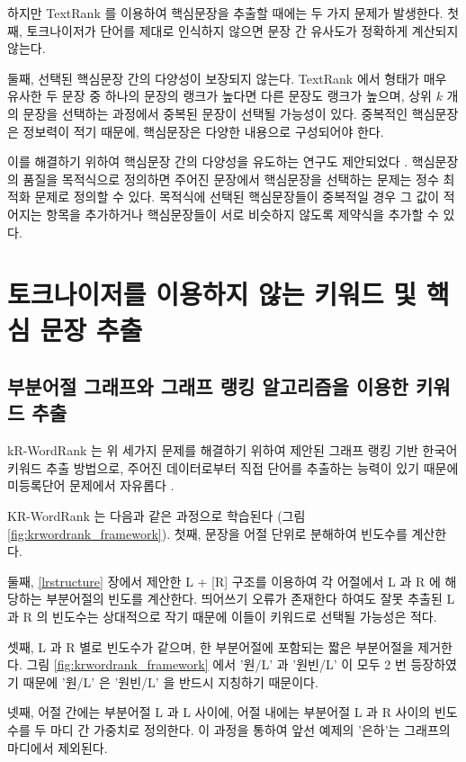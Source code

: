\documentclass[oneside, ko,phd]{snuthesis_utf8_kor}
\begin{document}
하지만 TextRank 를 이용하여 핵심문장을 추출할 때에는 두 가지 문제가 발생한다.
첫째, 토크나이저가 단어를 제대로 인식하지 않으면 문장 간 유사도가 정확하게 계산되지 않는다.

둘째, 선택된 핵심문장 간의 다양성이 보장되지 않는다.
TextRank 에서 형태가 매우 유사한 두 문장 중 하나의 문장의 랭크가 높다면 다른 문장도 랭크가 높으며, 상위 $k$ 개의 문장을 선택하는 과정에서 중복된 문장이 선택될 가능성이 있다.
중복적인 핵심문장은 정보력이 적기 때문에, 핵심문장은 다양한 내용으로 구성되어야 한다.

이를 해결하기 위하여 핵심문장 간의 다양성을 유도하는 연구도 제안되었다 \cite{mcdonald2007study, parveen2015topical}.
핵심문장의 품질을 목적식으로 정의하면 주어진 문장에서 핵심문장을 선택하는 문제는 정수 최적화 문제로 정의할 수 있다.
목적식에 선택된 핵심문장들이 중복적일 경우 그 값이 적어지는 항목을 추가하거나 핵심문장들이 서로 비슷하지 않도록 제약식을 추가할 수 있다.


\section{토크나이저를 이용하지 않는 키워드 및 핵심 문장 추출}

\subsection{부분어절 그래프와 그래프 랭킹 알고리즘을 이용한 키워드 추출}

kR-WordRank 는 위 세가지 문제를 해결하기 위하여 제안된 그래프 랭킹 기반 한국어 키워드 추출 방법으로, 주어진 데이터로부터 직접 단어를 추출하는 능력이 있기 때문에 미등록단어 문제에서 자유롭다 \cite{kim2014kr}.

KR-WordRank 는 다음과 같은 과정으로 학습된다 (그림 \ref{fig:krwordrank_framework}).
첫째, 문장을 어절 단위로 분해하여 빈도수를 계산한다.

둘째, \ref{lrstructure} 장에서 제안한 L + [R] 구조를 이용하여 각 어절에서 L 과 R 에 해당하는 부분어절의 빈도를 계산한다.
띄어쓰기 오류가 존재한다 하여도 잘못 추출된 L 과 R 의 빈도수는 상대적으로 작기 때문에 이들이 키워드로 선택될 가능성은 적다.

셋째, L 과 R 별로 빈도수가 같으며, 한 부분어절에 포함되는 짧은 부분어절을 제거한다.
그림 \ref{fig:krwordrank_framework} 에서 '원/L' 과 '원빈/L' 이 모두 2 번 등장하였기 때문에 '원/L' 은 '원빈/L' 을 반드시 지칭하기 때문이다.

넷째, 어절 간에는 부분어절 L 과 L 사이에, 어절 내에는 부분어절 L 과 R 사이의 빈도수를 두 마디 간 가중치로 정의한다.
이 과정을 통하여 앞선 예제의 '은하'는 그래프의 마디에서 제외된다.
\end{document}
